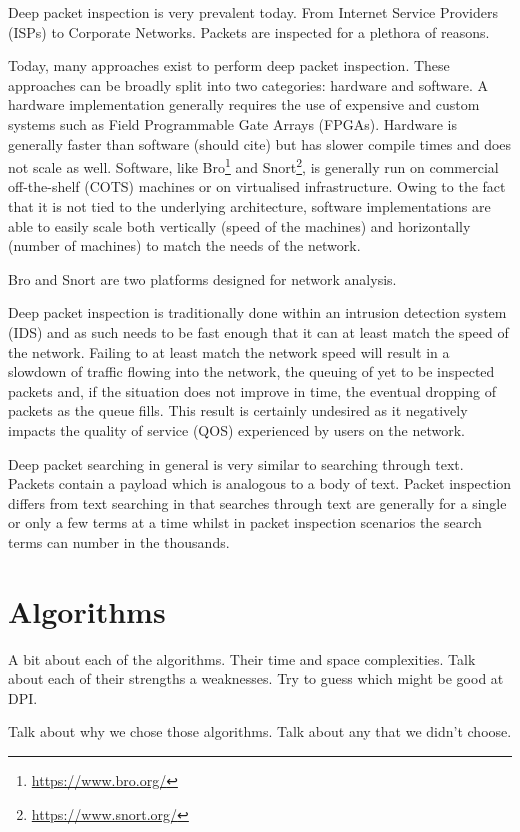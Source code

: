 \documentclass{article}
\begin{document}
Deep packet inspection is very prevalent today. From Internet Service Providers (ISPs) to Corporate Networks. Packets are inspected for a plethora of reasons. 

Today, many approaches exist to perform deep packet inspection. These approaches can be broadly split into two categories: hardware and software. A hardware implementation generally requires the use of expensive and custom systems such as Field Programmable Gate Arrays (FPGAs). Hardware is generally faster than software (should cite) but has slower compile times and does not scale as well. Software, like Bro\footnote{\url{https://www.bro.org/}} and Snort\footnote{\url{https://www.snort.org/}}, is generally run on commercial off-the-shelf (COTS) machines or on virtualised infrastructure. Owing to the fact that it is not tied to the underlying architecture, software implementations are able to easily scale both vertically (speed of the machines) and horizontally (number of machines) to match the needs of the network.

Bro and Snort are two platforms designed for network analysis.

Deep packet inspection is traditionally done within an intrusion detection system (IDS) and as such needs to be fast enough that it can at least match the speed of the network. Failing to at least match the network speed will result in a slowdown of traffic flowing into the network, the queuing of yet to be inspected packets and, if the situation does not improve in time, the eventual dropping of packets as the queue fills. This result is certainly undesired as it negatively impacts the quality of service (QOS) experienced by users on the network.  

Deep packet searching in general is very similar to searching through text. Packets contain a payload which is analogous to a body of text. Packet inspection differs from text searching in that searches through text are generally for a single or only a few terms at a time whilst in packet inspection scenarios the search terms can number in the thousands. 

\section{Algorithms} \label{algorithms}
A bit about each of the algorithms. Their time and space complexities. Talk about each of their strengths a weaknesses. Try to guess which might be good at DPI.

Talk about why we chose those algorithms. Talk about any that we didn't choose.
\end{document}
